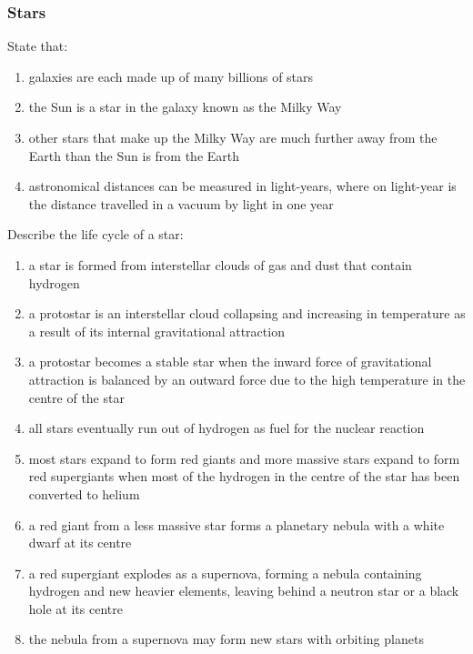 \subsubsection{Stars}
\begin{subpoint}
State that:
\begin{enumerate}[label=(\alph*)]
	\setlength\itemsep{0em}
	\item galaxies are each made up of many billions of stars
	\item the Sun is a star in the galaxy known as the Milky Way
	\item other stars that make up the Milky Way are much further away from the Earth
		than the Sun is from the Earth
	\item astronomical distances can be measured in light-years, where on light-year is
		the distance travelled in a vacuum by light in one year
\end{enumerate}
\end{subpoint}

\begin{subpoint}
Describe the life cycle of a star:
\begin{enumerate}[label=(\alph*)]
	\setlength\itemsep{0em}
\item a star is formed from interstellar clouds of gas and dust that contain hydrogen
\item a protostar is an interstellar cloud collapsing and increasing in temperature as a result of its internal
gravitational attraction
\item a protostar becomes a stable star when the inward force of gravitational attraction is balanced by an
outward force due to the high temperature in the centre of the star
\item all stars eventually run out of hydrogen as fuel for the nuclear reaction
\item most stars expand to form red giants and more massive stars expand to form red supergiants when
most of the hydrogen in the centre of the star has been converted to helium
\item a red giant from a less massive star forms a planetary nebula with a white dwarf at its centre
\item a red supergiant explodes as a supernova, forming a nebula containing hydrogen and new heavier
elements, leaving behind a neutron star or a black hole at its centre
\item the nebula from a supernova may form new stars with orbiting planets
\end{enumerate}
\end{subpoint}

